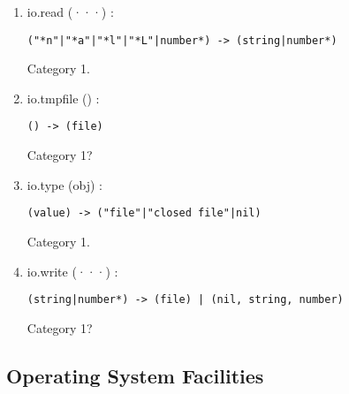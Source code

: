 \documentclass{paper}
\begin{document}
\begin{enumerate}
\begin{verbatim}
(string, "r"|"w"|nil) -> (file) | (nil, string, number)
\end{verbatim}
Category 1?
\item io.read (···) :
\begin{verbatim}
("*n"|"*a"|"*l"|"*L"|number*) -> (string|number*)
\end{verbatim}
Category 1.
\item io.tmpfile () :
\begin{verbatim}
() -> (file)
\end{verbatim}
Category 1?
\item io.type (obj) :
\begin{verbatim}
(value) -> ("file"|"closed file"|nil)
\end{verbatim}
Category 1.
\item io.write (···) :
\begin{verbatim}
(string|number*) -> (file) | (nil, string, number)
\end{verbatim}
Category 1?
\end{enumerate}

\subsection{Operating System Facilities}
\end{document}
